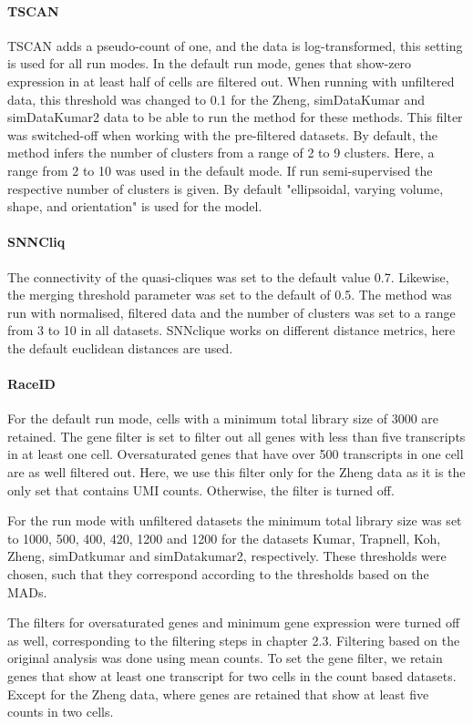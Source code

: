 \documentclass[11pt, a4paper]{article}\usepackage[]{graphicx}\usepackage[]{color}
\begin{document}
\paragraph{TSCAN}
TSCAN adds a pseudo-count of one, and the data is log-transformed, this setting is used for all run modes. 
In the default run mode, genes that show-zero expression in at least half of cells are filtered out. When running with unfiltered data, this threshold was changed to 0.1 for the Zheng, simDataKumar and simDataKumar2 data to be able to run the method for these methods.
This filter was switched-off when working with the pre-filtered datasets. By default, the method infers the number of clusters from a range of 2 to 9 clusters. Here, a range from 2 to 10 was used in the default mode. If run semi-supervised the respective number of clusters is given. By default "ellipsoidal, varying volume, shape, and orientation" is used for the model.

\paragraph{SNNCliq}
The connectivity of the quasi-cliques was set to the default value 0.7. Likewise, the merging threshold parameter was set to the default of 0.5. The method was run with normalised, filtered data and the number of clusters was set to a range from 3 to 10 in all datasets. SNNclique works on different distance metrics, here the default euclidean distances are used.

\paragraph{RaceID}

For the default run mode, cells with a minimum total library size of 3000 are retained. The gene filter is set to filter out all genes with less than five transcripts in at least one cell. Oversaturated genes that have over 500 transcripts in one cell are as well filtered out. Here, we use this filter only for the Zheng data as it is the only set that contains UMI counts. Otherwise, the filter is turned off.


For the run mode with unfiltered datasets the minimum total library size was set to 1000, 500, 400, 420, 1200 and 1200 for the datasets Kumar, Trapnell, Koh, Zheng, simDatkumar and simDatakumar2, respectively. These thresholds were chosen, such that they correspond according to the thresholds based on the MADs.  

The filters for oversaturated genes and minimum gene expression were turned off as well, corresponding to the filtering steps in chapter 2.3.
Filtering based on the original analysis was done using mean counts. To set the gene filter, we retain genes that show at least one transcript for two cells in the count based datasets. Except for the Zheng data, where genes are retained that show at least five counts in two cells. 
\end{document}
